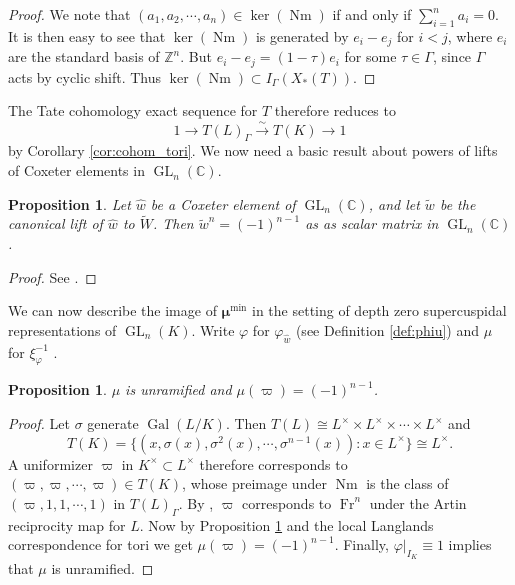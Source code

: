\documentclass{compositio}
\theoremstyle{plain}
\newtheorem{proposition}[theorem]{Proposition}
\theoremstyle{definition}
\DeclareMathOperator{\Gal}{Gal}
\DeclareMathOperator{\Nm}{Nm}
\DeclareMathOperator{\Fr}{Fr}
\DeclareMathOperator{\GL}{GL}
\newcommand{\CC}{\mathbb{C}}
\newcommand{\Kx}{K^\times}
\newcommand{\Lx}{L^\times}
\newcommand{\bmu}{\boldsymbol\mu}
\newcommand{\mumin}{\bmu^{\min}}
\begin{document}
\begin{proof}
We note that $(a_1, a_2, \cdots, a_n) \in \ker(\Nm)$ if and only if $\sum_{i=1}^n a_i = 0$.
It is then easy to see that $\ker(\Nm)$ is generated by $e_i - e_j$ for $i < j$, where
$e_i$ are the standard basis of $\mathbb{Z}^n$.  But $e_i - e_j = (1 - \tau)e_i$ for some
$\tau \in \Gamma$, since $\Gamma$ acts by cyclic shift.  Thus $\ker(\Nm) \subset I_{\Gamma}(X_*(T))$.
\end{proof}

The Tate cohomology exact sequence for $T$ therefore reduces to
$$1 \rightarrow T(L)_{\Gamma} \xrightarrow{\sim} T(K) \rightarrow 1$$ by
Corollary \ref{cor:cohom_tori}.  We now need a basic result about powers of lifts
of Coxeter elements in $\GL_{n}(\CC)$.

\begin{proposition}\label{prop:powers_of_lifts}
Let $\hat{w}$ be a Coxeter element of $\GL_{n}(\CC)$, and let $\tilde{w}$ be the
canonical lift of $\hat{w}$ to $\widetilde{W}$. Then $\tilde{w}^n = (-1)^{n-1}$ as
as scalar matrix in $\GL_{n}(\CC)$.
\end{proposition}

\begin{proof}
See \cite[\S3.1]{zaremsky:ppa}.
\end{proof}

We can now describe the image of $\mumin$ in the setting of
depth zero supercuspidal representations of $\GL_{n}(K)$.  Write
$\varphi$ for $\varphi_{\hat{w}}$ (see Definition \ref{def:phiu}) and $\mu$ for $\xi_{\varphi}^{-1}$ .

\begin{proposition} \label{prop:rectifier_agreement}
$\mu$ is unramified and
$\mu(\varpi) = (-1)^{n-1}$.
\end{proposition}

\begin{proof}
Let $\sigma$ generate $\Gal(L/K)$.  Then $T(L) \cong \Lx \times \Lx \times \cdots \times \Lx$ and
$$T(K) = \{(x, \sigma(x), \sigma^2(x), \cdots, \sigma^{n-1}(x)) : x \in \Lx \} \cong \Lx.$$
A uniformizer $\varpi$ in $\Kx \subset \Lx$
therefore corresponds to $(\varpi, \varpi, \cdots, \varpi) \in T(K)$, whose
preimage under $\Nm$ is the class of $(\varpi, 1, 1, \cdots, 1)$ in $T(L)_{\Gamma}$.
By \cite[\S 2.4]{serre:LocalClassFieldThy}, $\varpi$ corresponds to $\Fr^n$ under the Artin
reciprocity map for $L$.  Now by Proposition \ref{prop:powers_of_lifts}
and the local Langlands correspondence for tori we get
$\mu(\varpi) = (-1)^{n-1}$.
Finally, $\varphi|_{I_K} \equiv 1$ implies that $\mu$ is
unramified.
\end{proof}
\end{document}
